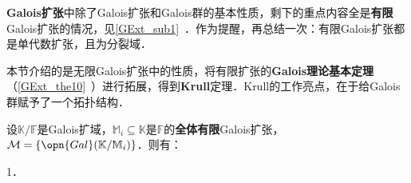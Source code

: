 


\textbf{Galois扩张}中除了Galois扩张和Galois群的基本性质，剩下的重点内容全是\textbf{有限}Galois扩张的情况，见\autoref{GExt_sub1}~．作为提醒，再总结一次：有限Galois扩张都是单代数扩张，且为分裂域．

本节介绍的是无限Galois扩张中的性质，将有限扩张的\textbf{Galois理论基本定理}（\autoref{GExt_the10}~）进行拓展，得到\textbf{Krull}定理．Krull的工作亮点，在于给Galois群赋予了一个拓扑结构．



\begin{theorem}{}
设$\mathbb{K}/\mathbb{F}$是Galois扩域，$\mathbb{M}_i\subseteq\mathbb{K}$是$\mathbb{F}$的\textbf{全体有限}Galois扩张，$\mathcal{M}=\{\opn{Gal}(\mathbb{K}/\mathbb{M}_i)\}$．则有：

1．



\end{theorem}






































